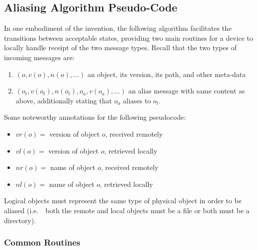 \subsection*{Aliasing Algorithm Pseudo-Code}

In one embodiment of the invention, the following algorithm facilitates the
transitions between acceptable states, providing two main routines for a device
to locally handle receipt of the two message types. Recall that the two types
of incoming messages are:
\begin{enumerate}
\item $(o, v(o), n(o), \ldots)$ an object, its version, its path, and other
  meta-data
\item $(o_t, v(o_t), n(o_t), o_a, v(o_a), \ldots)$
  an alias message with same content as above, additionally stating that
  $o_a$ aliases to $o_t$.
\end{enumerate}
Some noteworthy annotations for the following pseudocode:
\begin{itemize}
\item {\bf $vr(o) =$} version of object $o$, received remotely
\item {\bf $vl(o) =$} version of object $o$, retrieved locally
\item {\bf $nr(o) =$} name of object $o$, received remotely
\item {\bf $nl(o) =$} name of object $o$, retrieved locally
\end{itemize}
Logical objects must represent the same type of physical object in order to be
aliased (i.e.~\ both the remote and local objects must be a file or both must be
a directory).

\subsubsection*{Common Routines}


